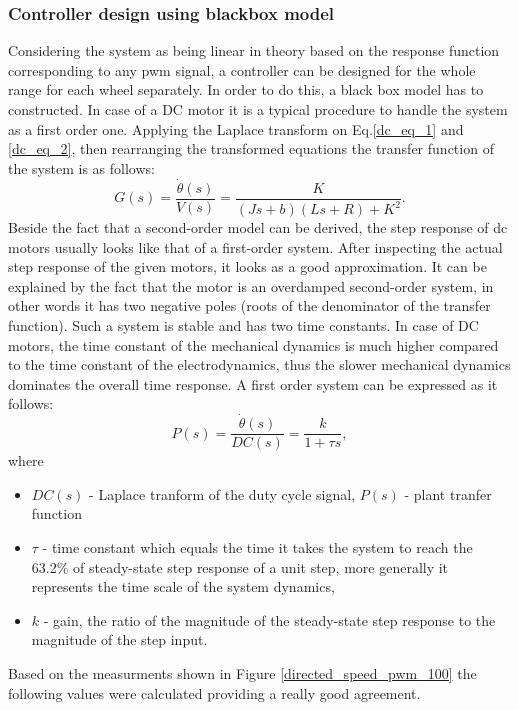 \documentclass[12pt,english]{article}
\begin{document}
\subsubsection{Controller design using blackbox model \cite{dc_motor_3}}
Considering the system as being linear in theory based on the response function corresponding to any pwm signal, a controller can be designed for the whole range for each wheel separately. In order to do this, a black box model has to constructed. In case of a DC motor it is a typical procedure to handle the system as a first order one. \cite{dc_motor_3} 
Applying the Laplace transform on Eq.\ref{dc_eq_1} and \ref{dc_eq_2}, then rearranging the transformed equations the transfer function of the system is as follows:
\begin{equation}
G(s) = \frac{\dot \theta (s)}{V(s)} = \frac{K}{(Js+b)(Ls+R)+K^2}.
\end{equation} 
Beside the fact that a second-order model can be derived, the step response of dc motors usually looks like that of a first-order system. After inspecting the actual step response of the given motors, it looks as a good approximation. It can be explained by the fact that the motor is an overdamped second-order system, in other words it has two negative poles (roots of the denominator of the transfer function). Such a system is stable and has two time constants. In case of DC motors, the time constant of the mechanical dynamics is much higher compared to the time constant of the electrodynamics, thus the slower mechanical dynamics dominates the overall time response. 
A first order system can be expressed as it follows:
\begin{equation}
P(s) = \frac{\dot{\theta}(s)}{DC(s)}= \frac{k}{1+\tau s},
\end{equation}
where
\begin{itemize}
	\item $DC(s)$ - Laplace tranform of the duty cycle signal, $P(s)$ - plant tranfer function
	\item $\tau$ - time constant which equals the time it takes the system to reach the 63.2\% of steady-state step response of a unit step, more generally it represents the time scale of the system dynamics,
	\item $k$ - gain, the ratio of the magnitude of the steady-state step response to the magnitude of the step input.
\end{itemize}
Based on the measurments shown in Figure \ref{directed_speed_pwm_100} the following values were calculated providing a really good agreement.
\end{document}
